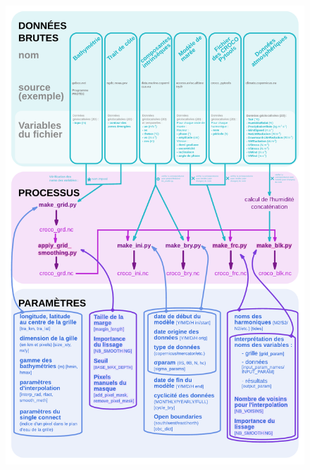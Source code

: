 \documentclass[10pt,a4paper,titlepage]{article}
\begin{document}
\begin{figure}[H]
    \begin{center}
        \includegraphics[scale=0.35]{../images/workflow/graphe_prepro_mere_new.pdf}

\end{center}
\end{figure}
\end{document}
